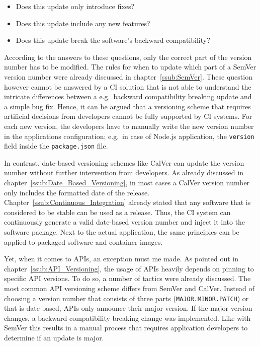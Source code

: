 \begin{itemize}
  \item Does this update only introduce fixes?
  \item Does this update include any new features?
  \item Does this update break the software's backward compatibility?
\end{itemize}

According to the answers to these questions, only the correct part of the
version number has to be modified. The rules for when to update which part of a
SemVer version number were already discussed in chapter~\ref{ssub:SemVer}.
These question however cannot be answered by a \ac{CI} solution that is not
able to understand the intricate differences between a e.g.\ backward
compatibility breaking update and a simple bug fix. Hence, it can be argued
that a versioning scheme that requires artificial decisions from developers
cannot be fully supported by \ac{CI} systems. For each new version, the
developers have to manually write the new version number in the applications
configuration; e.g.\ in case of Node.js application, the \texttt{version} field
inside the \texttt{package.json} file.

In contrast, date-based versioning schemes like CalVer can update the version
number without further intervention from developers. As already discussed in
chapter~\ref{ssub:Date_Based_Versioning}, in most cases a CalVer version number
only includes the formatted date of the release.
Chapter~\ref{ssub:Continuous_Integration} already stated that any software that
is considered to be stable can be used as a release. Thus, the \ac{CI} system
can continuously generate a valid date-based version number and inject it into
the software package. Next to the actual application, the same principles can
be applied to packaged software and container images.

Yet, when it comes to \acp{API}, an exception must me made. As pointed out in
chapter~\ref{ssub:API_Versioning}, the usage of \acp{API} heavily depends on
pinning to specific \ac{API} versions. To do so, a number of tactics were
already discussed. The most common \ac{API} versioning scheme differs from
SemVer and CalVer. Instead of choosing a version number that consists of three
parts (\texttt{MAJOR.MINOR.PATCH}) or that is date-based, \acp{API} only
announce their major version. If the major version changes, a backward
compatibility breaking change was implemented. Like with SemVer this results in
a manual process that requires application developers to determine if an update
is major.

